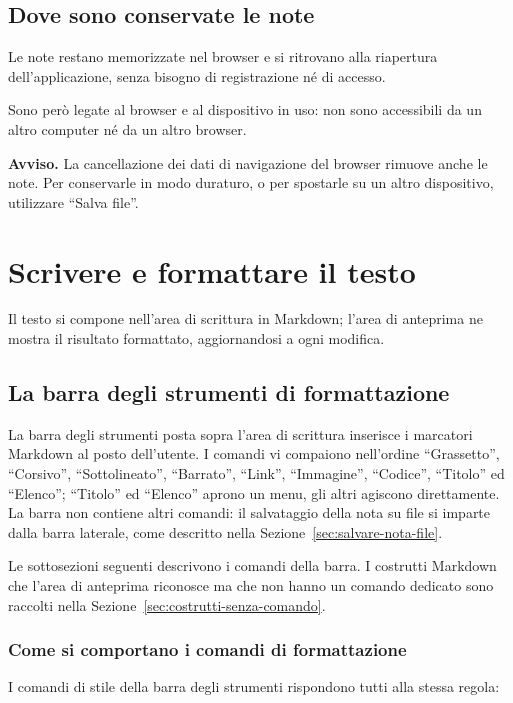 \documentclass[a4paper, 10pt]{article}
\begin{document}
\subsection{Dove sono conservate le note}
\label{sec:conservazione-note}
Le note restano memorizzate nel browser e si ritrovano alla riapertura dell'applicazione, senza bisogno di registrazione né di accesso.

Sono però legate al browser e al dispositivo in uso: non sono accessibili da un altro computer né da un altro browser.

\vspace{0.5em}

\noindent
\textbf{Avviso.} La cancellazione dei dati di navigazione del browser rimuove anche le note. Per conservarle in modo duraturo, o per spostarle su un altro dispositivo, utilizzare ``Salva file''.

\section{Scrivere e formattare il testo}
\label{sec:scrivere-formattare}
Il testo si compone nell'area di scrittura in Markdown; l'area di anteprima ne mostra il risultato formattato, aggiornandosi a ogni modifica.

\subsection{La barra degli strumenti di formattazione}
\label{sec:barra-strumenti-formattazione}
La barra degli strumenti posta sopra l'area di scrittura inserisce i marcatori Markdown al posto dell'utente. I comandi vi compaiono nell'ordine ``Grassetto'', ``Corsivo'', ``Sottolineato'', ``Barrato'', ``Link'', ``Immagine'', ``Codice'', ``Titolo'' ed ``Elenco''; ``Titolo'' ed ``Elenco'' aprono un menu, gli altri agiscono direttamente. La barra non contiene altri comandi: il salvataggio della nota su file si imparte dalla barra laterale, come descritto nella Sezione~\ref{sec:salvare-nota-file}.

Le sottosezioni seguenti descrivono i comandi della barra. I costrutti Markdown che l'area di anteprima riconosce ma che non hanno un comando dedicato sono raccolti nella Sezione~\ref{sec:costrutti-senza-comando}.

\subsubsection{Come si comportano i comandi di formattazione}
\label{sec:comandi-formattazione}
I comandi di stile della barra degli strumenti rispondono tutti alla stessa regola:
\end{document}
